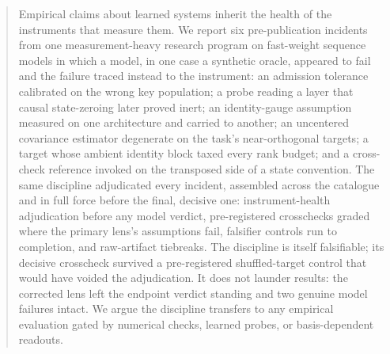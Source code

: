 \begin{abstract}
Empirical claims about learned systems inherit the health of the
instruments that measure them. We report six pre-publication incidents from one
measurement-heavy research program
on fast-weight sequence models in which a model, in one case a
synthetic oracle, appeared to
fail and the failure traced instead to the instrument: an admission
tolerance calibrated on the wrong key population; a probe reading a
layer that causal state-zeroing later proved inert; an identity-gauge
assumption measured on one architecture and carried to another; an
uncentered covariance estimator degenerate on the task's
near-orthogonal targets; a target whose ambient identity block taxed
every rank budget; and a cross-check reference invoked on the
transposed side of a state convention. The same discipline adjudicated every incident,
assembled across the catalogue and in full force before the final,
decisive one:
instrument-health adjudication before any model verdict,
pre-registered crosschecks graded where the primary lens's assumptions
fail, falsifier controls run to completion, and raw-artifact
tiebreaks. The discipline is itself falsifiable; its decisive
crosscheck survived a pre-registered shuffled-target control that
would have voided the adjudication. It does not launder results: the
corrected lens left the endpoint verdict standing and
two genuine model failures intact. We argue the discipline transfers
to any empirical evaluation gated by numerical checks, learned probes,
or basis-dependent readouts.
\end{abstract}
